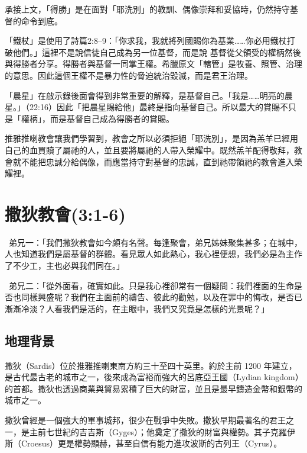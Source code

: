 承接上文，「得勝」是在面對「耶洗別」的教訓、偶像崇拜和妥協時，仍然持守基督的命令到底。

「鐵杖」是使用了詩篇2:8–9：「你求我，我就將列國賜你為基業……你必用鐵杖打破他們。」這裡不是說信徒自己成為另一位基督，而是說
基督從父領受的權柄然後與得勝者分享。得勝者與基督一同掌王權。希臘原文「轄管」是牧養、照管、治理的意思。因此這個王權不是暴力性的脅迫統治毀滅，而是君王治理。

「晨星」在啟示錄後面會得到非常重要的解釋，是基督自己。「我是……明亮的晨星。」（22:16）因此「把晨星賜給他」最終是指向基督自己。所以最大的賞賜不只是「權柄」，而是基督自己成為得勝者的賞賜。

推雅推喇教會讓我們學習到，教會之所以必須拒絕「耶洗別」，是因為羔羊已經用自己的血買贖了屬祂的人，並且要將屬祂的人帶入榮耀中。既然羔羊配得敬拜，教會就不能把忠誠分給偶像，而應當持守對基督的忠誠，直到祂帶領祂的教會進入榮耀裡。

\section{撒狄教會(3:1-6)}


\begin{DialogueBox}
\noindent\faUser\ 弟兄一：「我們撒狄教會如今頗有名聲。每逢聚會，弟兄姊妹聚集甚多；在城中，人也知道我們是屬基督的群體。看見眾人如此熱心，我心裡便想，我們必是為主作了不少工，主也必與我們同在。」

\noindent\faUser\ 弟兄二：「從外面看，確實如此。只是我心裡卻常有一個疑問：我們裡面的生命是否也同樣興盛呢？我們在主面前的禱告、彼此的勸勉，以及在罪中的悔改，是否已漸漸冷淡？人看我們是活的，在主眼中，我們又究竟是怎樣的光景呢？」
\end{DialogueBox}

\subsection{地理背景}

撒狄（Sardis）位於推雅推喇東南方約三十至四十英里。約於主前 1200 年建立，是古代最古老的城市之一，後來成為富裕而強大的呂底亞王國（Lydian kingdom）的首都。撒狄也透過商業與貿易累積了巨大的財富，並且是最早鑄造金幣和銀幣的城市之一。

撒狄曾經是一個強大的軍事城邦，很少在戰爭中失敗。撒狄早期最著名的君王之一，是主前七世紀的吉吉斯（Gyges）；他奠定了撒狄的財富與權勢。其子克羅伊斯（Croesus）更是權勢顯赫，甚至自信有能力進攻波斯的古列王（Cyrus）。

